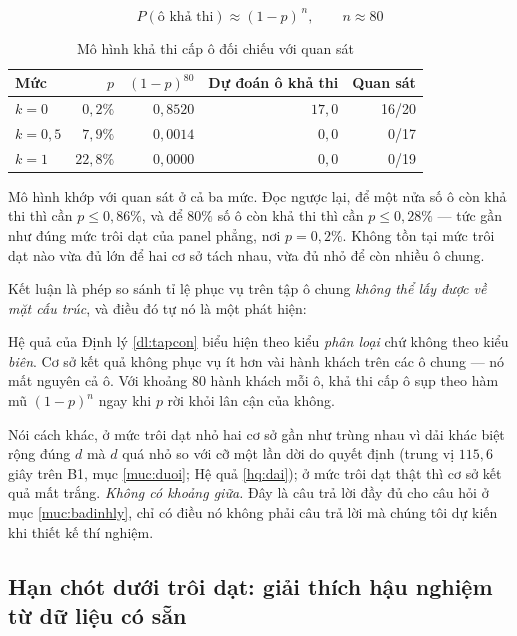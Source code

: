 \begin{equation}
P(\text{ô khả thi}) \approx (1-p)^{\,n}, \qquad n \approx 80
\end{equation}

\begin{table}[htbp]
\centering
\caption{Mô hình khả thi cấp ô đối chiếu với quan sát}
\label{bang:mohinh-kha-thi}
\small
\begin{tabular}{@{}lrrrr@{}}
\toprule
\textbf{Mức} & $p$ & $(1-p)^{80}$ & \textbf{Dự đoán ô khả thi} & \textbf{Quan sát}\\
\midrule
$k=0$ & $0{,}2\%$ & $0{,}8520$ & $17{,}0$ & 16/20\\
$k=0{,}5$ & $7{,}9\%$ & $0{,}0014$ & $0{,}0$ & 0/17\\
$k=1$ & $22{,}8\%$ & $0{,}0000$ & $0{,}0$ & 0/19\\
\bottomrule
\end{tabular}
\end{table}

Mô hình khớp với quan sát ở cả ba mức. Đọc ngược lại, để một nửa số ô còn khả thi thì cần
$p \le 0{,}86\%$, và để $80\%$ số ô còn khả thi thì cần $p \le 0{,}28\%$ --- tức gần như đúng
mức trôi dạt của panel phẳng, nơi $p = 0{,}2\%$. Không tồn tại mức trôi dạt nào vừa đủ lớn để
hai cơ sở tách nhau, vừa đủ nhỏ để còn nhiều ô chung.

Kết luận là phép so sánh tỉ lệ phục vụ trên tập ô chung \emph{không thể lấy được về mặt cấu
trúc}, và điều đó tự nó là một phát hiện:

\begin{khungy}
Hệ quả của Định lý \ref{dl:tapcon} biểu hiện theo kiểu \emph{phân loại} chứ không theo kiểu
\emph{biên}.
Cơ sở kết quả không phục vụ ít hơn vài hành khách trên các ô chung --- nó mất nguyên cả ô. Với
khoảng 80 hành khách mỗi ô, khả thi cấp ô sụp theo hàm mũ $(1-p)^{n}$ ngay khi $p$ rời khỏi
lân cận của không.
\end{khungy}

Nói cách khác, ở mức trôi dạt nhỏ hai cơ sở gần như trùng nhau vì dải khác biệt rộng đúng $d$
mà $d$ quá nhỏ so với cỡ một lần dời do quyết định (trung vị $115{,}6$ giây trên B1, mục
\ref{muc:duoi}; Hệ quả \ref{hq:dai}); ở mức trôi dạt thật thì cơ sở
kết quả mất trắng. \emph{Không có khoảng giữa.} Đây là câu trả lời đầy đủ cho câu hỏi ở mục
\ref{muc:badinhly}, chỉ có điều nó không phải câu trả lời mà chúng tôi dự kiến khi thiết kế thí
nghiệm.

\subsection{Hạn chót dưới trôi dạt: giải thích hậu nghiệm từ dữ liệu có sẵn}
\label{muc:haunghiem}

